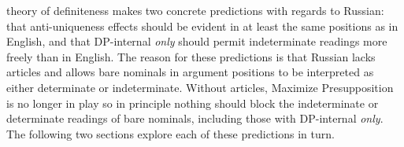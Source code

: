  theory of definiteness makes two concrete predictions with regards to Russian: that anti-uniqueness effects should be evident in at least the same positions as in English, and that DP-internal \textit{only} should permit indeterminate readings more freely than in English. The reason for these predictions is that Russian lacks articles and allows bare nominals in argument positions to be interpreted as either determinate or indeterminate. Without articles, Maximize Presupposition is no longer in play so in principle nothing should block the indeterminate or determinate readings of bare nominals, including those with DP-internal \textit{only}. The following two sections explore each of these predictions in turn.